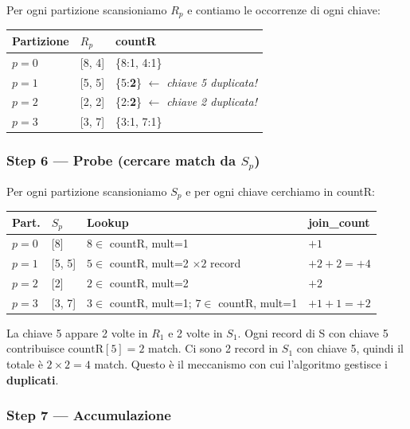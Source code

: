 \documentclass[11pt,a4paper]{article}
\begin{document}
Per ogni partizione scansioniamo $R_p$ e contiamo le occorrenze di ogni chiave:

\begin{center}\small
\begin{tabular}{lll}
\toprule
\textbf{Partizione} & $R_p$ & \textbf{countR}\\\midrule
$p=0$ & [8, 4] & \{8:1, 4:1\}\\
$p=1$ & [5, 5] & \{5:\textbf{2}\} $\leftarrow$ \emph{chiave 5 duplicata!}\\
$p=2$ & [2, 2] & \{2:\textbf{2}\} $\leftarrow$ \emph{chiave 2 duplicata!}\\
$p=3$ & [3, 7] & \{3:1, 7:1\}\\
\bottomrule
\end{tabular}
\end{center}

\subsubsection{Step 6 --- Probe (cercare match da $S_p$)}

Per ogni partizione scansioniamo $S_p$ e per ogni chiave cerchiamo in countR:

\begin{center}\small
\begin{tabular}{llll}
\toprule
\textbf{Part.} & $S_p$ & \textbf{Lookup} & \textbf{join\_count}\\\midrule
$p=0$ & [8] & $8 \in$ countR, mult=1 & $+1$\\
\rowcolor{green!8}
$p=1$ & [5, 5] & $5 \in$ countR, mult=2 $\times 2$ record & $+2+2 = +4$\\
$p=2$ & [2] & $2 \in$ countR, mult=2 & $+2$\\
$p=3$ & [3, 7] & $3 \in$ countR, mult=1; $7 \in$ countR, mult=1 & $+1+1 = +2$\\
\bottomrule
\end{tabular}
\end{center}

\begin{notebox}
La chiave 5 appare 2 volte in $R_1$ e 2 volte in $S_1$. Ogni record di S con chiave 5 contribuisce $\text{countR}[5] = 2$ match. Ci sono 2 record in $S_1$ con chiave 5, quindi il totale è $2 \times 2 = 4$ match. Questo è il meccanismo con cui l'algoritmo gestisce i \textbf{duplicati}.
\end{notebox}

\subsubsection{Step 7 --- Accumulazione}
\end{document}
